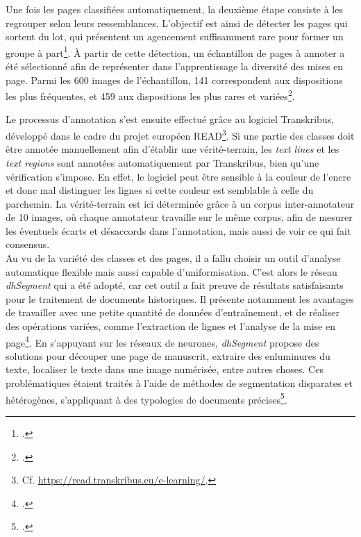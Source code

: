 \documentclass[a4paper,12pt,twoside]{book}
\begin{document}
    Une fois les pages classifiées automatiquement, la deuxième étape consiste à les regrouper selon leurs ressemblances. L'objectif est ainsi de détecter les pages qui sortent du lot, qui présentent un agencement suffisamment rare pour former un groupe à part\footcite[p. 8]{annotated_dataset_book_hours}. À partir de cette détection, un échantillon de pages à annoter a été sélectionné afin de représenter dans l'apprentissage la diversité des mises en page. Parmi les 600 images de l'échantillon, 141 correspondent aux dispositions les plus fréquentes, et 459 aux dispositions les plus rares et variées\footcite[p. 8]{annotated_dataset_book_hours}. 
    
    Le processus d'annotation s'est ensuite effectué grâce au logiciel Transkribus, développé dans le cadre du projet européen READ\footnote{Cf. \url{https://read.transkribus.eu/e-learning/}.}. Si une partie des classes doit être annotée manuellement afin d'établir une vérité-terrain, les \textit{text lines} et les \textit{text regions} sont annotées automatiquement par Transkribus, bien qu'une vérification s'impose. En effet, le logiciel peut être sensible à la couleur de l’encre et donc mal distinguer les lignes si cette couleur est semblable à celle du parchemin. La vérité-terrain est ici déterminée grâce à un corpus inter-annotateur de 10 images, où chaque annotateur travaille sur le même corpus, afin de mesurer les éventuels écarts et désaccords dans l'annotation, mais aussi de voir ce qui fait consensus. \\
    
    Au vu de la variété des classes et des pages, il a fallu choisir un outil d'analyse automatique flexible mais aussi capable d'uniformisation. C'est alors le réseau \textit{dhSegment} qui a été adopté, car cet outil a fait preuve de résultats satisfaisants pour le traitement de documents historiques. Il présente notamment les avantages de travailler avec une petite quantité de données d'entraînement, et de réaliser des opérations variées, comme l'extraction de lignes et l'analyse de la mise en page\footcite[p. 9]{annotated_dataset_book_hours}. En s'appuyant sur les réseaux de neurones, \textit{dhSegment} propose des solutions pour découper une page de manuscrit, extraire des enluminures du texte, localiser le texte dans une image numérisée, entre autres choses. Ces problématiques étaient traités à l'aide de méthodes de segmentation disparates et hétérogènes, s'appliquant à des typologies de documents précises\footcite[p. 1]{deep_learning_segmentation}. 
    
\end{document}
